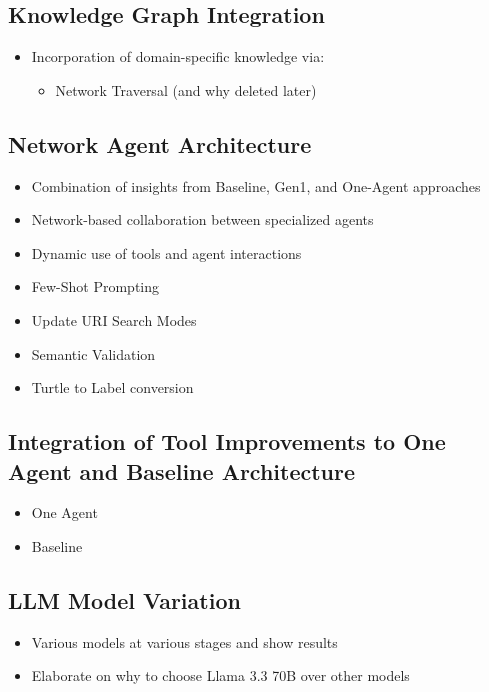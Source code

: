 \documentclass[a4paper,oneside,bibliography=totoc]{scrbook}
\begin{document}
\subsection{Knowledge Graph Integration}
\label{subsec:knowledge_graph_integration}
\begin{itemize}
  \item Incorporation of domain-specific knowledge via:
        \begin{itemize}
          \item Network Traversal (and why deleted later)

        \end{itemize}
\end{itemize}

\subsection{Network Agent Architecture}
\label{subsec:full_network_agent_architecture}
\begin{itemize}
  \item Combination of insights from Baseline, Gen1, and One-Agent approaches
  \item Network-based collaboration between specialized agents
  \item Dynamic use of tools and agent interactions
  \item Few-Shot Prompting
  \item Update URI Search Modes
  \item Semantic Validation
  \item Turtle to Label conversion
\end{itemize}

\subsection{Integration of Tool Improvements to One Agent and Baseline Architecture}
\label{subsec:performance_increases_gen2}
\begin{itemize}
  \item One Agent
  \item Baseline
\end{itemize}

\subsection{LLM Model Variation}
\label{subsec:llm_model_variation}
\begin{itemize}
  \item Various models at various stages and show results
  \item Elaborate on why to choose Llama 3.3 70B over other models
\end{itemize}
\end{document}
